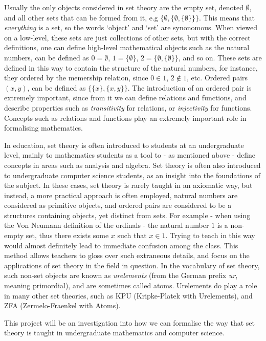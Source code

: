 \documentclass[11pt]{article}
\theoremstyle{definition}
\theoremstyle{theorem}
\theoremstyle{lemma}
\begin{document}
Usually the only objects considered in set theory are the empty set, denoted $\emptyset$, and all other sets that can be formed from it, e.g $\{\emptyset, \{\emptyset, \{\emptyset\}\}\}$. This means that \emph{everything} is a set, so the words `object' and `set' are synonomous.
When viewed on a low-level, these sets are just collections of other sets, but with the correct definitions, one can define high-level mathematical objects such as the natural numbers, can be defined as $0 = \emptyset$, $1=\{\emptyset\}$, $2=\{\emptyset, \{\emptyset\}\}$, and so on.
These sets are defined in this way to contain the structure of the natural numbers, for instance, they ordered by the memership relation, since $0\in 1$, $2\notin 1$, etc.
Ordered pairs $(x,y)$, can be defined as $\{\{x\},\{x,y\}\}$.
The introduction of an ordered pair is extremely important, since from it we can define relations and functions, and describe properties such as \emph{transitivity} for relations, or \emph{injectivity} for functions.
Concepts such as relations and functions play an extremely important role in formalising mathematics.

In education, set theory is often introduced to students at an undergraduate level, mainly to mathematics students as a tool to - as mentioned above - define concepts in areas such as analysis and algebra.
Set theory is often also introduced to undergraduate computer science students, as an insight into the foundations of the subject.
In these cases, set theory is rarely taught in an axiomatic way, but instead, a more practical approach is often employed, natural numbers are considered as primitive objects, and ordered pairs are considered to be a structures containing objects, yet distinct from sets.
For example - when using the Von Neumann definition of the ordinals - the natural number $1$ is a non-empty set, thus there exists some $x$ such that $x\in 1$.
Trying to teach in this way would almost definitely lead to immediate confusion among the class.
This method allows teachers to gloss over such extraneous details, and focus on the applications of set theory in the field in question.
In the vocabulary of set theory, such non-set objects are known as \emph{urelements} (from the German prefix \emph{ur}, meaning primordial), and are sometimes called atoms.
Urelements do play a role in many other set theories, such as KPU (Kripke-Platek with Urelements), and ZFA (Zermelo-Fraenkel with Atoms).

This project will be an investigation into how we can formalise the way that set theory is taught in undergraduate mathematics and computer science.
\end{document}
